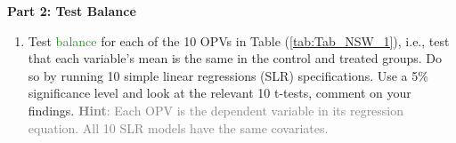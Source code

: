 \documentclass[
]{article}
\newenvironment{Shaded}{\begin{snugshade}}{\end{snugshade}}
\newcommand{\AttributeTok}[1]{\textcolor[rgb]{0.77,0.63,0.00}{#1}}
\newcommand{\CommentTok}[1]{\textcolor[rgb]{0.56,0.35,0.01}{\textit{#1}}}
\newcommand{\ControlFlowTok}[1]{\textcolor[rgb]{0.13,0.29,0.53}{\textbf{#1}}}
\newcommand{\DecValTok}[1]{\textcolor[rgb]{0.00,0.00,0.81}{#1}}
\newcommand{\FunctionTok}[1]{\textcolor[rgb]{0.00,0.00,0.00}{#1}}
\newcommand{\NormalTok}[1]{#1}
\newcommand{\OtherTok}[1]{\textcolor[rgb]{0.56,0.35,0.01}{#1}}
\newcommand{\SpecialCharTok}[1]{\textcolor[rgb]{0.00,0.00,0.00}{#1}}
\newcommand{\StringTok}[1]{\textcolor[rgb]{0.31,0.60,0.02}{#1}}
\providecommand{\tightlist}{%
  \setlength{\itemsep}{0pt}\setlength{\parskip}{0pt}}
\begin{document}
\textbf{Part 2: Test Balance}

\begin{enumerate}
\def\labelenumi{\arabic{enumi}.}
\tightlist
\item
  Test \textcolor{ForestGreen}{balance} for each of the 10 OPVs in Table
  (\ref{tab:Tab_NSW_1}), i.e., test that each variable's mean is the
  same in the control and treated groups. Do so by running 10 simple
  linear regressions (SLR) specifications. Use a 5\% significance level
  and look at the relevant 10 t-tests, comment on your findings.
  \textcolor{gray}{\textbf{Hint}: Each OPV is the dependent variable in its regression equation. All 10 SLR models have the same covariates.}
\end{enumerate}

\begin{Shaded}
\end{Shaded}
\end{document}
